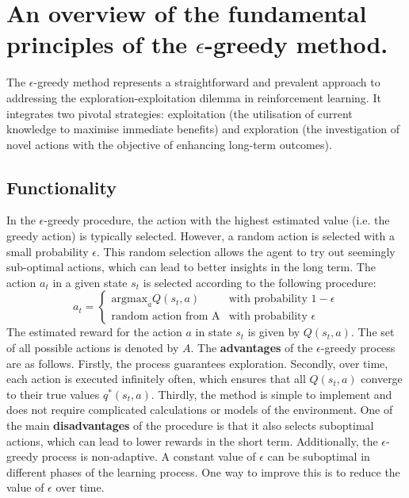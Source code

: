 \documentclass[twocolumn]{webofc}
\begin{document}
\section{An overview of the fundamental principles of the $\epsilon$-greedy method.}\label{sec:fig-tables}
The $\epsilon$-greedy method represents a straightforward and prevalent approach to addressing the exploration-exploitation dilemma in reinforcement learning. It integrates two pivotal strategies: exploitation (the utilisation of current knowledge to maximise immediate benefits) and exploration (the investigation of novel actions with the objective of enhancing long-term outcomes).
\subsection{Functionality}
In the $\epsilon$-greedy procedure, the action with the highest estimated value (i.e. the greedy action) is typically selected. However, a random action is selected with a small probability $\epsilon$. This random selection allows the agent to try out seemingly sub-optimal actions, which can lead to better insights in the long term.
The action $a_t$ in a given state $s_t$ is selected according to the following procedure:
\begin{equation}
a_t =
  \begin{cases} 
   \text{argmax}_a Q(s_t, a) & \text{with probability } 1 - \epsilon \\
   \text{random action from A} & \text{with probability } \epsilon 
  \end{cases}
\end{equation}
The estimated reward for the action $a$ in state $s_t$ is given by $Q(s_t, a)$. The set of all possible actions is denoted by $A$.
The \textbf{advantages} of the $\epsilon$-greedy process are as follows. Firstly, the process guarantees exploration. Secondly, over time, each action is executed infinitely often, which ensures that all $Q(s_t, a)$ converge to their true values $q^*(s_t, a)$. \cite{sutton-2018} Thirdly, the method is simple to implement and does not require complicated calculations or models of the environment.\newline
One of the main \textbf{disadvantages} of the procedure is that it also selects suboptimal actions, which can lead to lower rewards in the short term. Additionally, the $\epsilon$-greedy process is non-adaptive. A constant value of $\epsilon$ can be suboptimal in different phases of the learning process. One way to improve this is to reduce the value of $\epsilon$ over time.
\end{document}
